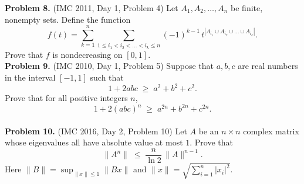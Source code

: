 \documentclass{article}
\begin{document}
\textbf{Problem 8.} (IMC 2011, Day 1, Problem 4)
Let \( A_1, A_2, \ldots, A_n \) be finite, nonempty sets. Define the function
\[
f(t) = \sum_{k=1}^{n} \sum_{1 \leq i_1 < i_2 < \ldots < i_k \leq n} (-1)^{k-1}\, t^{|A_{i_1} \cup A_{i_2} \cup \ldots \cup A_{i_k}|}.
\]
Prove that \( f \) is nondecreasing on \( [0, 1] \).
\\

\textbf{Problem 9.} (IMC 2010, Day 1, Problem 5)
Suppose that \( a, b, c \) are real numbers in the interval \( [-1, 1] \) such that
\[
1 + 2abc \;\geq\; a^2 + b^2 + c^2.
\]
Prove that for all positive integers \( n \),
\[
1 + 2(abc)^n \;\geq\; a^{2n} + b^{2n} + c^{2n}.
\]
\\

\textbf{Problem 10.} (IMC 2016, Day 2, Problem 10)
Let \( A \) be an \( n \times n \) complex matrix whose eigenvalues all have absolute value at most \( 1 \). Prove that
\[
\| A^n \| \;\leq\; \frac{n}{\ln 2}\, \| A \|^{n-1}.
\]
Here \( \| B \| = \sup_{\|x\| \leq 1} \| Bx \| \) and \( \| x \| = \sqrt{\sum_{i=1}^n |x_i|^2} \).
\end{document}
